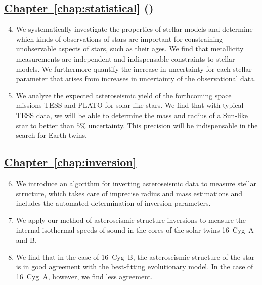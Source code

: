 \subsection*{\hspace*{0.5cm}\hyperref[chap:statistical]{Chapter~\ref{chap:statistical}} ()}
\begin{enumerate}
    \setcounter{enumi}{3}
    \item We systematically investigate the properties of stellar models and determine which kinds of observations of stars are important for constraining unobservable aspects of stars, such as their ages. 
    We find that metallicity measurements are independent and indispensable constraints to stellar models. 
    We furthermore quantify the increase in uncertainty for each stellar parameter that arises from increases in uncertainty of the observational data. 
    \item We analyze the expected asteroseismic yield of the forthcoming space missions TESS and PLATO for solar-like stars. 
    We find that with typical TESS data, we will be able to determine the mass and radius of a Sun-like star to better than $5\%$ uncertainty. 
    This precision will be indispensable in the search for Earth twins. 
\end{enumerate}

\subsection*{\hspace*{0.5cm}\hyperref[chap:inversion]{Chapter~\ref{chap:inversion}} \citep{2017ApJ...851...80B}}
\begin{enumerate}
    \setcounter{enumi}{5}
    \item We introduce an algorithm for inverting asteroseismic data to measure stellar structure, which takes care of imprecise radius and mass estimations and includes the automated determination of inversion parameters. 
    \item We apply our method of asteroseismic structure inversions to measure the internal isothermal speeds of sound in the cores of the solar twins 16~Cyg~A and B. 
    \item We find that in the case of 16~Cyg~B, the asteroseismic structure of the star is in good agreement with the best-fitting evolutionary model. In the case of 16~Cyg~A, however, we find less agreement. 
\end{enumerate}

